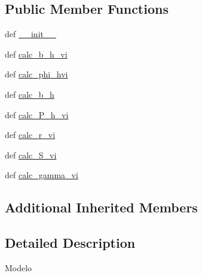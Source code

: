 \subsection*{Public Member Functions}
\begin{DoxyCompactItemize}
\item 
def \hyperlink{class_models_1_1_gqs_rcon_1_1_model_a7c105d2b098c02a92d820b563b3f9626}{\-\_\-\-\_\-init\-\_\-\-\_\-}
\item 
def \hyperlink{class_models_1_1_gqs_rcon_1_1_model_a7c17483b4152aae30746e9020cc9b2a7}{calc\-\_\-b\-\_\-h\-\_\-vi}
\item 
def \hyperlink{class_models_1_1_gqs_rcon_1_1_model_acc67fde18afe6f23d15ee63365858643}{calc\-\_\-phi\-\_\-hvi}
\item 
def \hyperlink{class_models_1_1_gqs_rcon_1_1_model_a9e3520749c7bf68bfbd4285abf1ab9a5}{calc\-\_\-b\-\_\-h}
\item 
def \hyperlink{class_models_1_1_gqs_rcon_1_1_model_ae41680c4c2ab719168f233d2a75318bc}{calc\-\_\-\-P\-\_\-h\-\_\-vi}
\item 
def \hyperlink{class_models_1_1_gqs_rcon_1_1_model_a82100aed9f6ceec6608f48fa07b2de15}{calc\-\_\-r\-\_\-vi}
\item 
def \hyperlink{class_models_1_1_gqs_rcon_1_1_model_a1b18fbb828ecb04cd4b044f977bbe78c}{calc\-\_\-\-S\-\_\-vi}
\item 
def \hyperlink{class_models_1_1_gqs_rcon_1_1_model_a6480b364645c9906d56ac5448018ad27}{calc\-\_\-gamma\-\_\-vi}
\end{DoxyCompactItemize}
\subsection*{Additional Inherited Members}


\subsection{Detailed Description}
\begin{DoxyVerb}Modelo\end{DoxyVerb}
 

